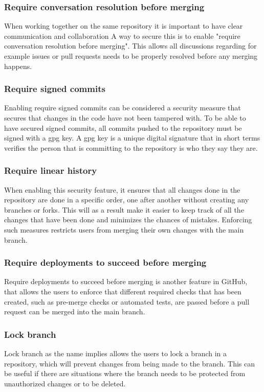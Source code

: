 \subsubsection{Require conversation resolution before merging}
When working together on the same repository it is important to have  clear communication and collaboration  A way to secure this is to enable "require conversation resolution before merging". This allows all discussions regarding for example issues or pull requests needs to be properly resolved before any merging happens. 
\\
\subsubsection{Require signed commits}
Enabling require signed commits can be considered a security measure that secures that changes in the code have not been tampered with. 
To be able to have secured signed commits, all commits pushed to the repository must be signed with a \acrlong{gpg} key. A \acrshort{gpg} key is  a unique digital signature that in short terms verifies the person that is committing to the repository is who they say they are. 


\subsubsection{Require linear history}
When enabling this security feature, it ensures that all changes done in the repository are done in a specific order, one after another without creating any branches or forks. This will as a result make it easier to keep track of all the changes that have been done and minimizes the chances of mistakes. Enforcing such measures restricts users from merging their own changes with the main branch. 
\newpage

\subsubsection{Require deployments to succeed before merging}
Require deployments to succeed before merging is another feature in GitHub, that allows the users to enforce that different required checks that has been created, such as pre-merge checks or automated tests, are passed before a pull request can be merged into the main branch.

\subsubsection{Lock branch}
Lock branch as the name implies allows the users to lock a branch in a repository, which will prevent changes from being made to the branch. This can be useful if there are situations where the branch needs to be protected from unauthorized changes or to be deleted. 

